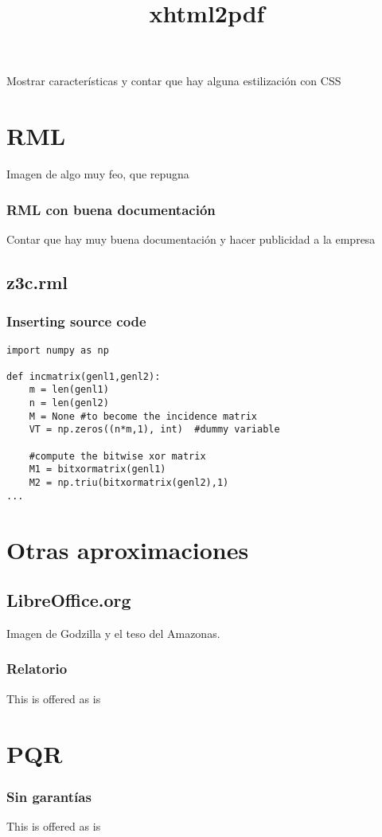\documentclass[10pt,xcolor={usenames,dvipsnames}]{beamer}
\begin{document}
\begin{frame}
\title{xhtml2pdf}

Mostrar características y contar que hay alguna estilización con CSS

\end{frame}

\section{RML}

\begin{frame}

Imagen de algo muy feo, que repugna

\end{frame}

\begin{frame}
\frametitle{RML con buena documentación}

Contar que hay muy buena documentación y hacer publicidad a la empresa

\end{frame}


\subsection{z3c.rml}

\begin{frame}[fragile]
\frametitle{Inserting source code}
\begin{verbatim}
import numpy as np
 
def incmatrix(genl1,genl2):
    m = len(genl1)
    n = len(genl2)
    M = None #to become the incidence matrix
    VT = np.zeros((n*m,1), int)  #dummy variable
 
    #compute the bitwise xor matrix
    M1 = bitxormatrix(genl1)
    M2 = np.triu(bitxormatrix(genl2),1) 
...
\end{verbatim}
\end{frame}

\section{Otras aproximaciones}
\subsection{LibreOffice.org}

\begin{frame}

Imagen de Godzilla y el teso del Amazonas.

\end{frame}


\begin{frame}
\frametitle{Relatorio}

This is offered as is

\end{frame}


\section{PQR}

\begin{frame}
\frametitle{Sin garantías}

This is offered as is

\end{frame}
\end{document}
